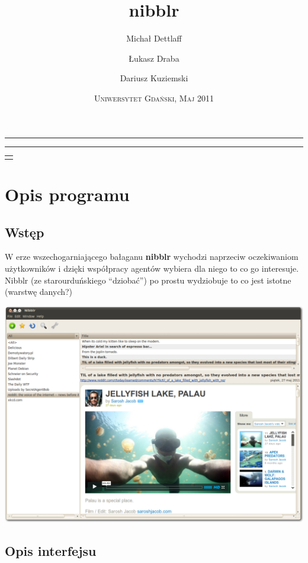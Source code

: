 \documentclass[a4paper,11pt]{report}
\title{nibblr}
\author{Michał Dettlaff \and Łukasz Draba \and Dariusz Kuziemski}
\date{\textsc{Uniwersytet Gdański, Maj 2011}}
\makeatletter
\newcommand{\linia}{\rule{\linewidth}{0.5mm}}
\renewcommand{\maketitle}{\begin{titlepage}
    \vspace*{5cm}
    \noindent\linia
    \begin{center} 
      \LARGE\textsc{\@title}
     \end{center}
     \linia
    \vspace{2cm}
    \begin{flushright}
    \begin{minipage}{5cm}
    \begin{tabular}[t]{l}%
    \@author
    \end{tabular}\par
    \end{minipage}
     \end{flushright}
    \vfill
    \begin{center}
    \@date
    \end{center}
  \end{titlepage}
}
\makeatother
\begin{document}
\maketitle

\section{Opis programu}


\subsection{Wstęp}
W erze wszechogarniającego bałaganu \textbf{nibblr} wychodzi naprzeciw
oczekiwaniom użytkowników i dzięki współpracy agentów wybiera dla niego to co go
interesuje. Nibblr (ze starourduńskiego ``dziobać'') %
po prostu wydziobuje to co jest istotne (warstwę danych?)

\begin{center}
	\includegraphics[scale=0.27]{./img/nibblr0.png}
\end{center}

\newpage
\subsection{Opis interfejsu}
\end{document}
